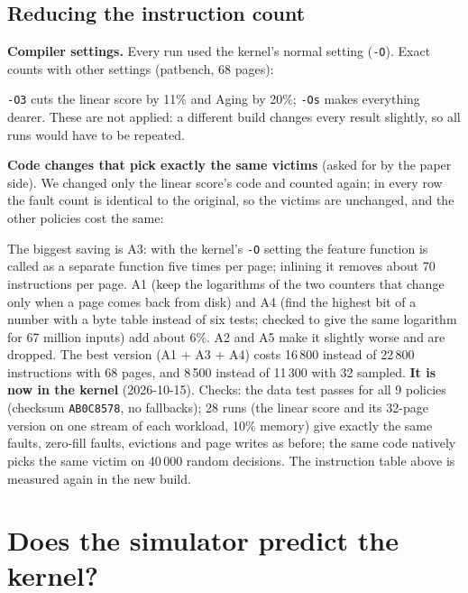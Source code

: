 \documentclass[10.5pt,a4paper]{article}
\newcommand{\code}[1]{\texttt{#1}}
\begin{document}
\subsection{Reducing the instruction count}
\label{sec:reduce}

\textbf{Compiler settings.} Every run used the kernel's normal setting (\code{-O}). Exact counts with other settings (patbench, 68 pages):

\begin{center}\small

\end{center}

\code{-O3} cuts the linear score by 11\% and Aging by 20\%; \code{-Os} makes everything dearer. These are not applied: a different build changes every result slightly, so all runs would have to be repeated.

\textbf{Code changes that pick exactly the same victims} (asked for by the paper side). We changed only the linear score's code and counted again; in every row the fault count is identical to the original,
so the victims are unchanged, and the other policies cost the same:

\begin{center}\small
\resizebox{\linewidth}{!}{}
\end{center}

The biggest saving is A3: with the kernel's \code{-O} setting the feature function is called as a separate function five times per page; inlining it removes about 70 instructions per page.
A1 (keep the logarithms of the two counters that change only when a page comes back from disk) and A4 (find the highest bit of a number with a byte table instead of six tests; checked to give the same
logarithm for 67 million inputs) add about 6\%. A2 and A5 make it slightly worse and are dropped. The best version (A1 + A3 + A4) costs 16\,800 instead of 22\,800 instructions with 68 pages, and 8\,500 instead of 11\,300 with 32 sampled. \textbf{It is now in the kernel} (2026-10-15). Checks: the data test passes for all 9 policies (checksum \code{AB0C8578}, no fallbacks); 28 runs (the linear score and its 32-page version on one stream of each workload, 10\% memory) give exactly the same faults, zero-fill faults, evictions and page writes as before; the same code natively picks the same victim on 40\,000 random decisions. The instruction table above is measured again in the new build.

\section{Does the simulator predict the kernel?}
\label{sec:gap}
\end{document}

